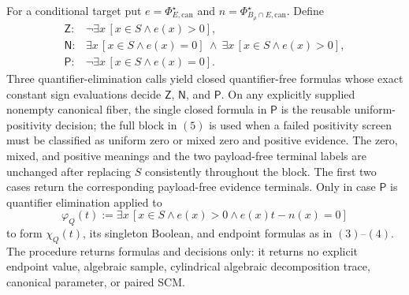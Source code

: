 For a conditional target put \(e=\Phi_{E,\mathrm{can}}^\star\) and \(n=\Phi_{B_\rho\cap E,\mathrm{can}}^\star\).  Define
\[
\begin{array}{ll}
\mathsf Z:&\neg\exists x\,[x\in S\wedge e(x)>0],\\
\mathsf N:&\exists x\,[x\in S\wedge e(x)=0]
\ \wedge\ \exists x\,[x\in S\wedge e(x)>0],\\
\mathsf P:&\neg\exists x\,[x\in S\wedge e(x)=0].
\end{array}
\tag{5}
\]
Three quantifier-elimination calls yield closed quantifier-free formulas whose exact constant sign evaluations decide \(\mathsf Z\), \(\mathsf N\), and \(\mathsf P\).  On any explicitly supplied nonempty canonical fiber, the single closed formula in \(\mathsf P\) is the reusable uniform-positivity decision; the full block in \((5)\) is used when a failed positivity screen must be classified as uniform zero or mixed zero and positive evidence.  The zero, mixed, and positive meanings and the two payload-free terminal labels are unchanged after replacing \(S\) consistently throughout the block.  The first two cases return the corresponding payload-free evidence terminals.  Only in case \(\mathsf P\) is quantifier elimination applied to
\[
\varphi_Q(t):=\exists x\,[x\in S\wedge e(x)>0\wedge e(x)t-n(x)=0]
\tag{6}
\]
to form \(\chi_Q(t)\), its singleton Boolean, and endpoint formulas as in \((3)\)--\((4)\).  The procedure returns formulas and decisions only: it returns no explicit endpoint value, algebraic sample, cylindrical algebraic decomposition trace, canonical parameter, or paired SCM.